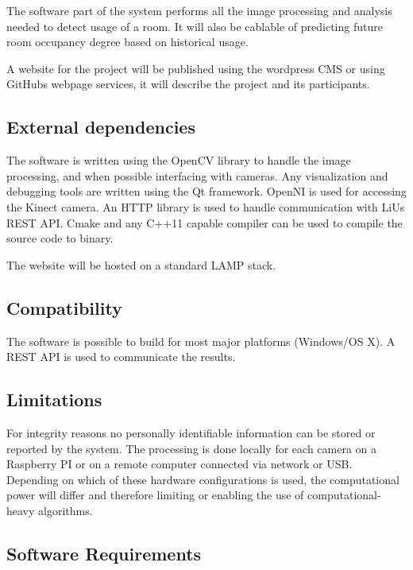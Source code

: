 The software part of the system performs all the image processing and analysis needed to detect usage of a room. It will also be cablable of predicting future room occupancy degree based on historical usage. 

A website for the project will be published using the wordpress CMS or using GitHubs webpage services, it will describe the project and its participants.
 
\subsection{External dependencies}
The software is written using the OpenCV library to handle the image processing, and when possible interfacing with cameras. 
Any visualization and debugging tools are written using the Qt framework. 
OpenNI is used for accessing the Kinect camera. 
An HTTP library is used to handle communication with LiUs REST API.
Cmake and any C++11 capable compiler can be used to compile the source code to binary.

The website will be hosted on a standard LAMP stack.

\subsection{Compatibility}
The software is possible to build for most major platforms (Windows/OS X). A REST API is used to communicate the results.

\subsection{Limitations}
For integrity reasons no personally identifiable information can be stored or reported by the system. The processing is done locally for each camera on a Raspberry PI or on a remote computer connected via network or USB. Depending on which of these hardware configurations is used, the computational power will differ and therefore limiting or enabling the use of computational-heavy algorithms.  

\subsection{Software Requirements}
\label{sec:software_req}
\reqtable
{	
}